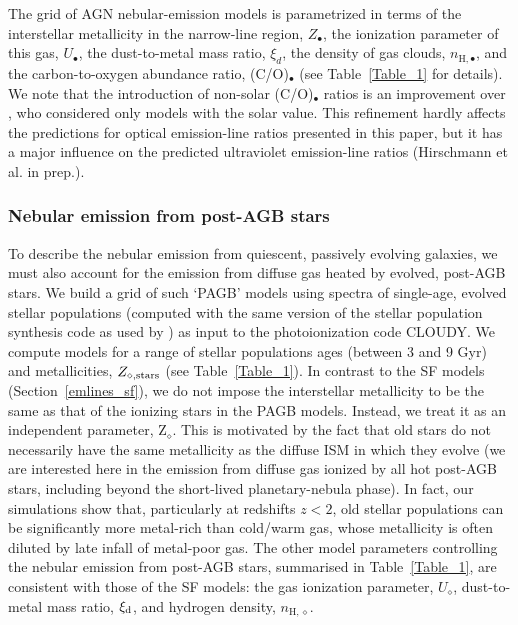 \documentclass[fleqn,usenatbib]{mnras}
\begin{document}
The grid of AGN nebular-emission models is parametrized
in terms of the interstellar metallicity in the narrow-line region,
$Z_{\bullet}$, the ionization parameter of this gas, $U_{\bullet}$,
the dust-to-metal  mass ratio, $\xi_d$, the density of gas clouds,
$n_{\mathrm{H}, \bullet}$,  and the carbon-to-oxygen  abundance ratio,
(C/O)$_\bullet$ (see  Table~\ref{Table_1} for details). We note that
the introduction of non-solar (C/O)$_\bullet$ ratios is an improvement
over \citet{Feltre16}, who considered only models with the solar
value. This refinement hardly affects the predictions for optical
emission-line  ratios presented in this paper, but it has a major
influence on the predicted ultraviolet  emission-line ratios
(Hirschmann et al. in prep.).  


\subsubsection{Nebular emission from post-AGB stars}\label{emlines_pagb}

To describe the nebular emission from quiescent, passively evolving
galaxies, we must also account for the emission from diffuse gas
heated by evolved,  post-AGB stars. We
build a grid of such `PAGB' models using spectra of single-age,
evolved stellar populations (computed with the same  version  of the
\citealt{Bruzual03} stellar population synthesis code as used by
\citealt{Gutkin16}) as input to the photoionization code {\scshape
  CLOUDY}.  We compute models for a range of stellar populations ages
(between 3 and 9 Gyr) and metallicities, $Z_{\diamond, {\rm stars}}$ (see
Table~\ref{Table_1}). In contrast to the SF models
(Section~\ref{emlines_sf}), we do not impose the  interstellar
metallicity to be the same as that of the ionizing stars in the PAGB
models.  Instead, we treat it as an independent parameter,
Z$_{\diamond}$. This is motivated by the fact that old stars do not
necessarily have the same metallicity as  the diffuse ISM in which
they evolve (we are interested here in the emission from diffuse 
gas ionized by all hot post-AGB stars, including  beyond the 
short-lived planetary-nebula phase). In
fact, our simulations show that, particularly at redshifts  $z<2$, old
stellar populations can be significantly more metal-rich than
cold/warm gas,  whose metallicity is often diluted by late infall of
metal-poor gas. The other model  parameters controlling the nebular
emission from post-AGB stars, summarised in  Table~\ref{Table_1}, are
consistent with those of the SF models: the gas ionization  parameter,
$U_{\diamond}$, dust-to-metal mass ratio, $\xi_{\rm d}$, and hydrogen
density, $n_{\mathrm{H}, \diamond}$.  
\end{document}
